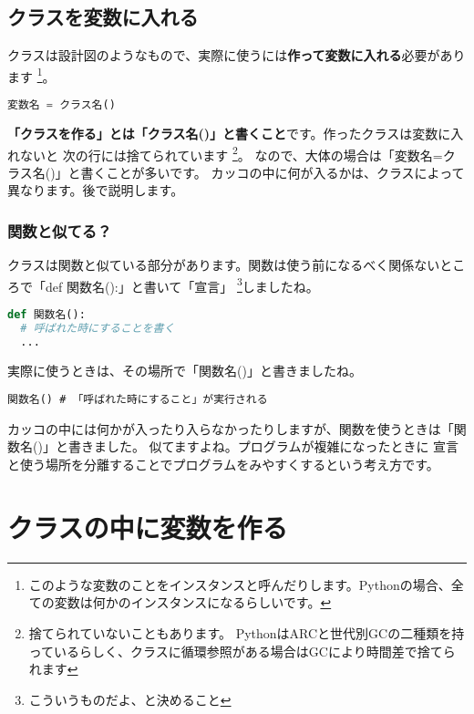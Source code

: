 \subsection{クラスを変数に入れる}
クラスは設計図のようなもので、実際に使うには\textbf{作って変数に入れる}必要があります
\footnote{このような変数のことをインスタンスと呼んだりします。Pythonの場合、全ての変数は何かのインスタンスになるらしいです。}。
\begin{lstlisting}[caption=クラスを変数に入れる,label=sample, language=Python]
変数名 = クラス名()
\end{lstlisting}
\textbf{「クラスを作る」とは「クラス名()」と書くこと}です。作ったクラスは変数に入れないと
次の行には捨てられています
\footnote{捨てられていないこともあります。
  PythonはARCと世代別GCの二種類を持っているらしく、クラスに循環参照がある場合はGCにより時間差で捨てられます}。
なので、大体の場合は「変数名=クラス名()」と書くことが多いです。
カッコの中に何が入るかは、クラスによって異なります。後で説明します。

\subsubsection{関数と似てる？}
クラスは関数と似ている部分があります。関数は使う前になるべく関係ないところで「def 関数名():」と書いて「宣言」
\footnote{こういうものだよ、と決めること}しましたね。
\begin{lstlisting}[caption=関数の作り方,label=sample, language=Python]
def 関数名():
  # 呼ばれた時にすることを書く
  ...
\end{lstlisting}
実際に使うときは、その場所で「関数名()」と書きましたね。
\begin{lstlisting}[caption=関数の呼び出し方,label=sample]
関数名() # 「呼ばれた時にすること」が実行される
\end{lstlisting}
カッコの中には何かが入ったり入らなかったりしますが、関数を使うときは「関数名()」と書きました。
似てますよね。プログラムが複雑になったときに
宣言と使う場所を分離することでプログラムをみやすくするという考え方です。

\section{クラスの中に変数を作る}
